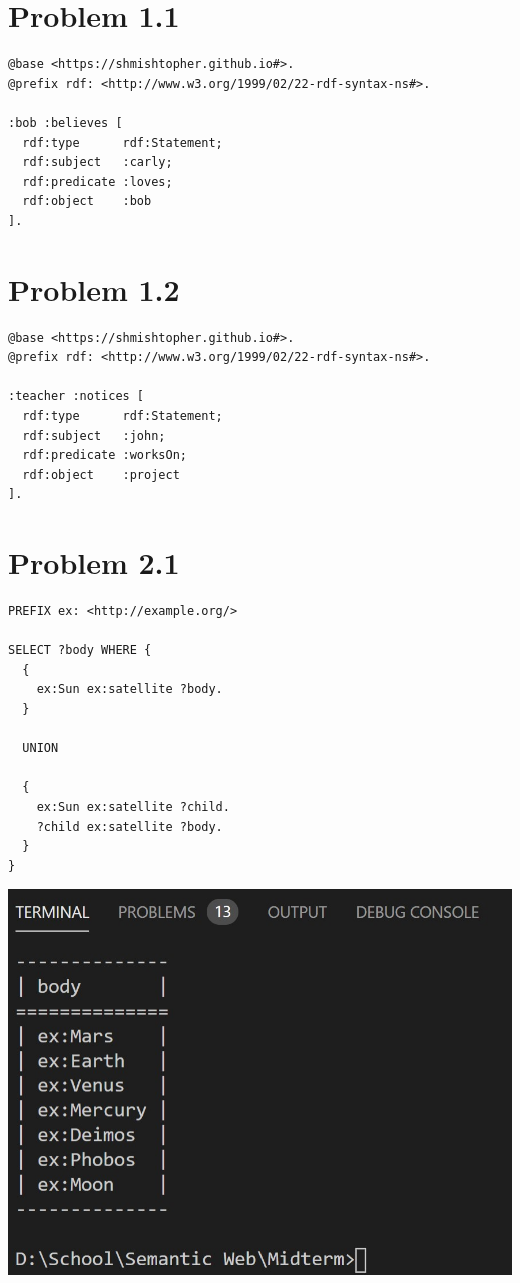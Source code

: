 \documentclass{article}
\newenvironment{problem}[1]{
  \nobreak\section*{Problem #1}
}{}
\begin{document}
  \begin{problem}{1.1}
    \begin{verbatim}
@base <https://shmishtopher.github.io#>.
@prefix rdf: <http://www.w3.org/1999/02/22-rdf-syntax-ns#>.

:bob :believes [
  rdf:type      rdf:Statement;
  rdf:subject   :carly;
  rdf:predicate :loves;
  rdf:object    :bob
].
    \end{verbatim}
  \end{problem}

  \begin{problem}{1.2}
    \begin{verbatim}
@base <https://shmishtopher.github.io#>.
@prefix rdf: <http://www.w3.org/1999/02/22-rdf-syntax-ns#>.

:teacher :notices [
  rdf:type      rdf:Statement;
  rdf:subject   :john;
  rdf:predicate :worksOn;
  rdf:object    :project
].
    \end{verbatim}
  \end{problem}

  \pagebreak
  \begin{problem}{2.1}
    \begin{verbatim}
PREFIX ex: <http://example.org/>

SELECT ?body WHERE {
  { 
    ex:Sun ex:satellite ?body.
  } 
  
  UNION
  
  {
    ex:Sun ex:satellite ?child.
    ?child ex:satellite ?body.
  }
}
    \end{verbatim}

    \includegraphics{images/0.jpg}
  \end{problem}
\end{document}
